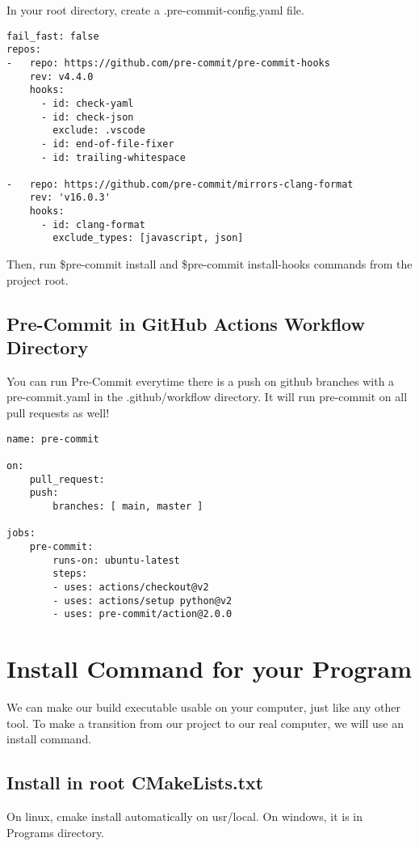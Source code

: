 \documentclass[openany]{report}
\begin{document}
In your root directory, create a .pre-commit-config.yaml file.

\begin{verbatim}
fail_fast: false
repos:
-   repo: https://github.com/pre-commit/pre-commit-hooks
    rev: v4.4.0
    hooks:
      - id: check-yaml
      - id: check-json
        exclude: .vscode
      - id: end-of-file-fixer
      - id: trailing-whitespace

-   repo: https://github.com/pre-commit/mirrors-clang-format
    rev: 'v16.0.3'
    hooks:
      - id: clang-format
        exclude_types: [javascript, json]
\end{verbatim}

Then, run \$pre-commit install and \$pre-commit install-hooks commands from the project root.


\subsection{Pre-Commit in GitHub Actions Workflow Directory}

You can run Pre-Commit everytime there is a push on github branches with a pre-commit.yaml in the .github/workflow 
directory. It will run pre-commit on all pull requests as well!

\begin{verbatim}
name: pre-commit

on:
    pull_request:
    push:
        branches: [ main, master ]

jobs:
    pre-commit:
        runs-on: ubuntu-latest
        steps:
        - uses: actions/checkout@v2
        - uses: actions/setup python@v2
        - uses: pre-commit/action@2.0.0
\end{verbatim}


\section{Install Command for your Program}

We can make our build executable usable on your computer, just like any other tool. To make a transition from 
our project to our real computer, we will use an install command.


\subsection{Install in root CMakeLists.txt}

On linux, cmake install automatically on usr/local. On windows, it is in Programs directory.
\end{document}
